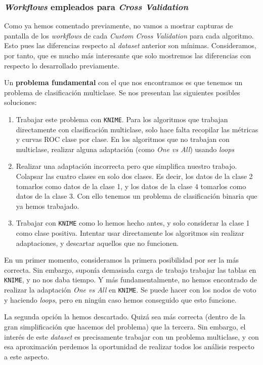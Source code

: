 \documentclass[11pt]{article}
\begin{document}
\subsubsection{\emph{Workflows} empleados para \emph{Cross Validation}} \label{dataset02_decision:seccion}

Como ya hemos comentado previamente, no vamos a mostrar capturas de pantalla de los \emph{workflows} de cada \emph{Custom Cross Validation} para cada algoritmo. Esto pues las diferencias respecto al \emph{dataset} anterior son mínimas. Consideramos, por tanto, que es mucho más interesante que solo mostremos las diferencias con respecto lo desarrollado previamente.

Un \textbf{problema fundamental} con el que nos encontramos es que tenemos un problema de clasificación multiclase. Se nos presentan las siguientes posibles soluciones:

\begin{enumerate}
    \item Trabajar este problema con \lstinline{KNIME}. Para los algoritmos que trabajan directamente con clasificación multiclase, solo hace falta recopilar las métricas y curvas ROC clase por clase. En los algoritmos que no trabajan con multiclase, realizar alguna adaptación (como \emph{One vs All}) usando \emph{loops}
    \item Realizar una adaptación incorrecta pero que simplifica nuestro trabajo. Colapsar las cuatro clases en solo dos clases. Es decir, los datos de la clase 2 tomarlos como datos de la clase 1, y los datos de la clase 4 tomarlos como datos de la clase 3. Con ello tenemos un problema de clasificación binaria que ya hemos trabajado.
    \item Trabajar con \lstinline{KNIME} como lo hemos hecho antes, y solo considerar la clase 1 como clase positiva. Intentar usar directamente los algoritmos sin realizar adaptaciones, y descartar aquellos que no funcionen.
\end{enumerate}

En un primer momento, consideramos la primera posibilidad por ser la más correcta. Sin embargo, suponía demasiada carga de trabajo trabajar las tablas en \lstinline{KNIME}, y no nos daba tiempo. Y más fundamentalmente, no hemos encontrado de realizar la adaptación \emph{One vs All} en \lstinline{KNIME}. Se puede hacer con los nodos de voto y haciendo \emph{loops}, pero en ningún caso hemos conseguido que esto funcione.

La segunda opción la hemos descartado. Quizá sea más correcta (dentro de la gran simplificación que hacemos del problema) que la tercera. Sin embargo, el interés de este \emph{dataset} es precisamente trabajar con un problema multiclase, y con esa aproximación perdemos la oportunidad de realizar todos los análisis respecto a este aspecto.
\end{document}
